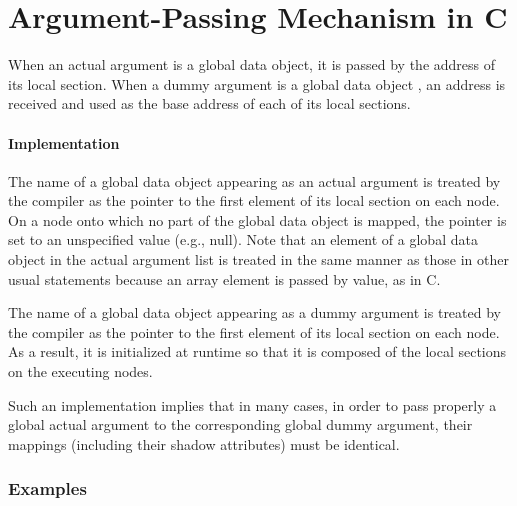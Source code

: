 \section{Argument-Passing Mechanism in {\XMP} C}

When an actual argument is a global data object, it is passed by the address
of its local section.
%
When a dummy argument is a global data object , an address is received and
used as the base address of each of its local sections.


\paragraph*{Implementation}

The name of a global data object appearing as an actual argument is
treated by the {\XMP} compiler as the pointer to the first element of
its local section on each node.
%
On a node onto which no part of the global data object is mapped, the
pointer is set to an unspecified value (e.g., null).
%
Note that an element of a global data object in the actual argument list is
treated in the same manner as those in other usual statements because an
array element is passed by value, as in C.

The name of a global data object appearing as a dummy argument is
treated by the {\XMP} compiler as the pointer to the first element of
its local section on each node.
%
As a result, it is initialized at runtime so that it is
composed of the local sections on the executing nodes.

Such an implementation implies that in many cases, in order to pass
properly a global actual argument to the corresponding global dummy 
argument, their mappings (including their shadow attributes) must be
identical.

\subsubsection*{Examples}

